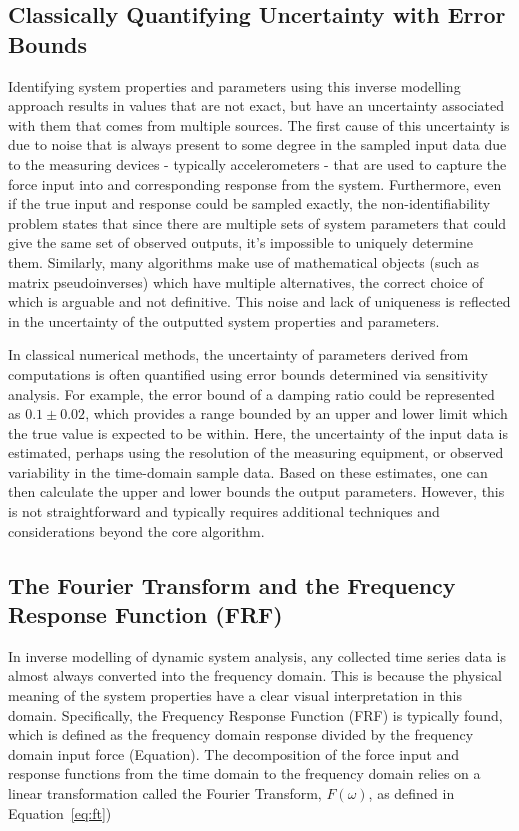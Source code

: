 \documentclass[12pt]{article}
\begin{document}
    \subsection{Classically Quantifying Uncertainty with Error Bounds}
    Identifying system properties and parameters using this inverse modelling approach results in values that are not exact, but have an uncertainty associated with them that comes from multiple sources.
    The first cause of this uncertainty is due to noise that is always present to some degree in the sampled input data due to the measuring devices - typically accelerometers - that are used to capture the force input into and corresponding response from the system.
    Furthermore, even if the true input and response could be sampled exactly, the non-identifiability problem states that since there are multiple sets of system parameters that could give the same set of observed outputs, it's impossible to uniquely determine them.
    Similarly, many algorithms make use of mathematical objects (such as matrix pseudoinverses) which have multiple alternatives, the correct choice of which is arguable and not definitive.
    This noise and lack of uniqueness is reflected in the uncertainty of the outputted system properties and parameters.

    In classical numerical methods, the uncertainty of parameters derived from computations is often quantified using error bounds determined via sensitivity analysis.
    For example, the error bound of a damping ratio could be represented as $0.1 \pm 0.02$, which provides a range bounded by an upper and lower limit which the true value is expected to be within.
    Here, the uncertainty of the input data is estimated, perhaps using the resolution of the measuring equipment, or observed variability in the time-domain sample data.
    Based on these estimates, one can then calculate the upper and lower bounds the output parameters.
    However, this is not straightforward and typically requires additional techniques and considerations beyond the core algorithm.


    \subsection{The Fourier Transform and the Frequency Response Function (FRF)}

    In inverse modelling of dynamic system analysis, any collected time series data is almost always converted into the frequency domain.
    This is because the physical meaning of the system properties have a clear visual interpretation in this domain.
    Specifically, the Frequency Response Function (FRF) is typically found, which is defined as the frequency domain response divided by the frequency domain input force (Equation). %
    The decomposition of the force input and response functions from the time domain to the frequency domain relies on a linear transformation called the Fourier Transform, $F(\omega)$, as defined in Equation~\ref{eq:ft})
\end{document}
